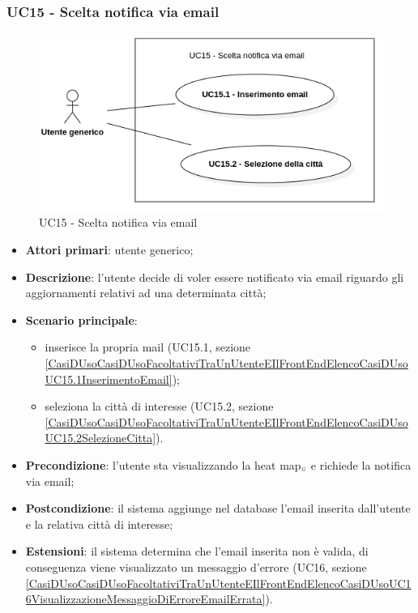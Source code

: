 \subsubsection{UC15 - Scelta notifica via email }\label{CasiDUsoCasiDUsoFacoltativiTraUnUtenteEIlFrontEndElencoCasiDUsoUC15NotificaViaEmailDiUnaCittaSelezionata}

\begin{center}
	\begin{figure}[H]
		\centering\includegraphics[scale=0.7]{../immagini/attori_casi/UC15_1_2.png}
		\caption{UC15 - Scelta notifica via email}
	\end{figure}
\end{center}

\begin{itemize}
	\item \textbf{Attori primari}: utente generico;
	\item \textbf{Descrizione}: l'utente decide di voler essere notificato via email riguardo gli aggiornamenti relativi ad una determinata città;
	\item \textbf{Scenario principale}:
		\begin{itemize}
			\item inserisce la propria mail (UC15.1, sezione \ref{CasiDUsoCasiDUsoFacoltativiTraUnUtenteEIlFrontEndElencoCasiDUsoUC15.1InserimentoEmail});
			\item seleziona la città di interesse (UC15.2, sezione \ref{CasiDUsoCasiDUsoFacoltativiTraUnUtenteEIlFrontEndElencoCasiDUsoUC15.2SelezioneCitta}).
		\end{itemize}
	\item \textbf{Precondizione}: l'utente sta visualizzando la heat map$_{\scaleto{G}{3pt}}$ e richiede la notifica via email;
	\item \textbf{Postcondizione}: il sistema aggiunge nel database l'email inserita dall'utente e la relativa città di interesse;
	\item \textbf{Estensioni}: il sistema determina che l'email inserita non è valida, di conseguenza viene visualizzato un messaggio d'errore (UC16, sezione \ref{CasiDUsoCasiDUsoFacoltativiTraUnUtenteEIlFrontEndElencoCasiDUsoUC16VisualizzazioneMessaggioDiErroreEmailErrata}).
\end{itemize}

